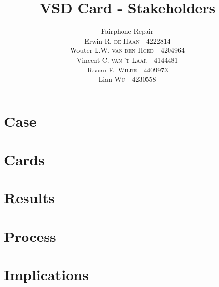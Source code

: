 \documentclass[final]{scrartcl} %
\title{VSD Card - Stakeholders}
\author{Fairphone Repair \\
Erwin R. \textsc{de Haan} - 4222814\\
Wouter L.W. \textsc{van den Hoed} - 4204964 \\
Vincent C. \textsc{van 't Laar} - 4144481 \\
Ronan E. \textsc{Wilde} - 4409973 \\
Lian \textsc{Wu} - 4230558 \\}
\begin{document}
\maketitle
\section{Case}
\section{Cards}
\section{Results}
\section{Process}
\section{Implications}

\printbibliography
\end{document}
